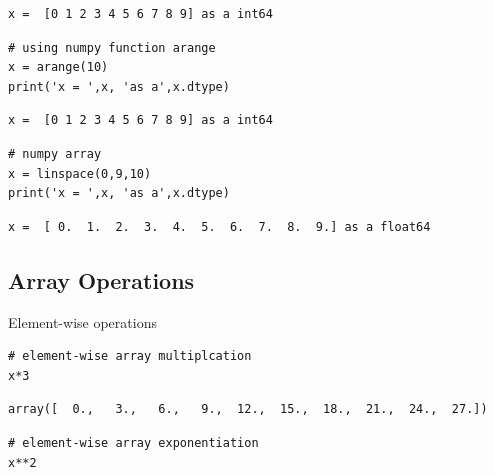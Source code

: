\documentclass[%
oneside,                 %
final,                   %
10pt]{article}
\begin{document}
\begin{Verbatim}[numbers=none,fontsize=\fontsize{9pt}{9pt},baselinestretch=0.95,xleftmargin=2mm]
x =  [0 1 2 3 4 5 6 7 8 9] as a int64
\end{Verbatim}

\begin{Verbatim}[numbers=none,fontsize=\fontsize{9pt}{9pt},baselinestretch=0.95,xleftmargin=2mm]
# using numpy function arange
x = arange(10)
print('x = ',x, 'as a',x.dtype)
\end{Verbatim}

\begin{Verbatim}[numbers=none,fontsize=\fontsize{9pt}{9pt},baselinestretch=0.95,xleftmargin=2mm]
x =  [0 1 2 3 4 5 6 7 8 9] as a int64
\end{Verbatim}

\begin{Verbatim}[numbers=none,fontsize=\fontsize{9pt}{9pt},baselinestretch=0.95,xleftmargin=2mm]
# numpy array
x = linspace(0,9,10)
print('x = ',x, 'as a',x.dtype)
\end{Verbatim}

\begin{Verbatim}[numbers=none,fontsize=\fontsize{9pt}{9pt},baselinestretch=0.95,xleftmargin=2mm]
x =  [ 0.  1.  2.  3.  4.  5.  6.  7.  8.  9.] as a float64
\end{Verbatim}

\subsection{Array Operations}

Element-wise operations
\begin{Verbatim}[numbers=none,fontsize=\fontsize{9pt}{9pt},baselinestretch=0.95,xleftmargin=2mm]
# element-wise array multiplcation
x*3
\end{Verbatim}


\begin{Verbatim}[numbers=none,fontsize=\fontsize{9pt}{9pt},baselinestretch=0.95,xleftmargin=2mm]
array([  0.,   3.,   6.,   9.,  12.,  15.,  18.,  21.,  24.,  27.])
\end{Verbatim}


\begin{Verbatim}[numbers=none,fontsize=\fontsize{9pt}{9pt},baselinestretch=0.95,xleftmargin=2mm]
# element-wise array exponentiation
x**2
\end{Verbatim}
\end{document}
